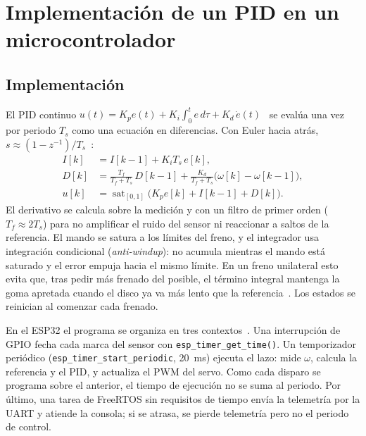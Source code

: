 \section{Implementación de un PID en un microcontrolador}
\label{sec:p3}

\subsection{Implementación}
El PID continuo $u(t)=K_p e(t)+K_i\int_0^t e\,d\tau+K_d\,\dot e(t)$~\cite{astrom2006advanced} se
evalúa una vez por periodo $T_s$ como una ecuación en diferencias. Con Euler hacia atrás,
$s\approx(1-z^{-1})/T_s$~\cite{astrom1997computer,ogata1996discreto}:
\begin{align}
  I[k] &= I[k-1] + K_i T_s\,e[k], \label{eq:integral}\\
  D[k] &= \frac{T_f}{T_f+T_s}\,D[k-1] + \frac{K_d}{T_f+T_s}\big(\omega[k]-\omega[k-1]\big),\\
  u[k] &= \operatorname{sat}_{[0,1]}\big(K_p e[k] + I[k-1] + D[k]\big).
\end{align}
El derivativo se calcula sobre la medición y con un filtro de primer orden ($T_f\approx 2T_s$) para
no amplificar el ruido del sensor ni reaccionar a saltos de la referencia. El mando se satura a los
límites del freno, y el integrador usa integración condicional (\emph{anti-windup}): no acumula
mientras el mando está saturado y el error empuja hacia el mismo límite. En un freno unilateral
esto evita que, tras pedir más frenado del posible, el término integral mantenga la goma apretada
cuando el disco ya va más lento que la referencia~\cite{astrom2006advanced}. Los estados se
reinician al comenzar cada frenado.

En el ESP32 el programa se organiza en tres contextos~\cite{espidf}. Una interrupción de GPIO fecha
cada marca del sensor con \texttt{esp\_timer\_get\_time()}. Un temporizador periódico
(\texttt{esp\_timer\_start\_periodic}, 20~ms) ejecuta el lazo: mide $\omega$, calcula la
referencia y el PID, y actualiza el PWM del servo. Como cada disparo se programa sobre el
anterior, el tiempo de ejecución no se suma al periodo. Por último, una tarea de FreeRTOS sin
requisitos de tiempo envía la telemetría por la UART y atiende la consola; si se atrasa, se pierde
telemetría pero no el periodo de control.

